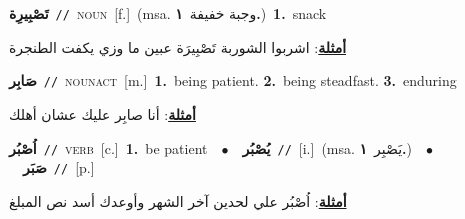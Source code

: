\documentclass[10pt,a4paper,twoside]{article} %
\begin{document}
\begin{multicols}{2}
{{{{{\setlength\topsep{0pt}\textbf{\foreignlanguage{arabic}{تَصْبِيرِة}}\ {\color{gray}\texttt{//}\color{black}}\ \textsc{noun}\ [f.]\ \color{gray}(msa. \foreignlanguage{arabic}{وجبة خفيفة}~\foreignlanguage{arabic}{\textbf{١.}})\color{black}\ \textbf{1.}~snack\  \begin{flushright}\color{gray}\foreignlanguage{arabic}{\textbf{\underline{\foreignlanguage{arabic}{أمثلة}}}: اشربوا الشوربة تَصْبِيرَة عبين ما وزي يكفت الطنجرة}\end{flushright}\color{black}} \vspace{2mm}

{\setlength\topsep{0pt}\textbf{\foreignlanguage{arabic}{صَابِر}}\ {\color{gray}\texttt{//}\color{black}}\ \textsc{noun\textunderscore act}\ [m.]\ \textbf{1.}~being patient.  \textbf{2.}~being steadfast.  \textbf{3.}~enduring\  \begin{flushright}\color{gray}\foreignlanguage{arabic}{\textbf{\underline{\foreignlanguage{arabic}{أمثلة}}}: أنا صابِر عليك عشان أهلك}\end{flushright}\color{black}} \vspace{2mm}

{\setlength\topsep{0pt}\textbf{\foreignlanguage{arabic}{اُصْبُر}}\ {\color{gray}\texttt{//}\color{black}}\ \textsc{verb}\ [c.]\ \textbf{1.}~be patient\ \ $\bullet$\ \ \setlength\topsep{0pt}\textbf{\foreignlanguage{arabic}{يُصْبُر}}\ {\color{gray}\texttt{//}\color{black}}\ [i.]\ \color{gray}(msa. \foreignlanguage{arabic}{يَصْبِر}~\foreignlanguage{arabic}{\textbf{١.}})\color{black}\ \ $\bullet$\ \ \setlength\topsep{0pt}\textbf{\foreignlanguage{arabic}{صَبَر}}\ {\color{gray}\texttt{//}\color{black}}\ [p.]\  \begin{flushright}\color{gray}\foreignlanguage{arabic}{\textbf{\underline{\foreignlanguage{arabic}{أمثلة}}}: اُصْبُر علي لحدين آخر الشهر وأوعدك أسد نص المبلغ}\end{flushright}\color{black}} \vspace{2mm}

}}}}
\end{multicols}
\end{document}

